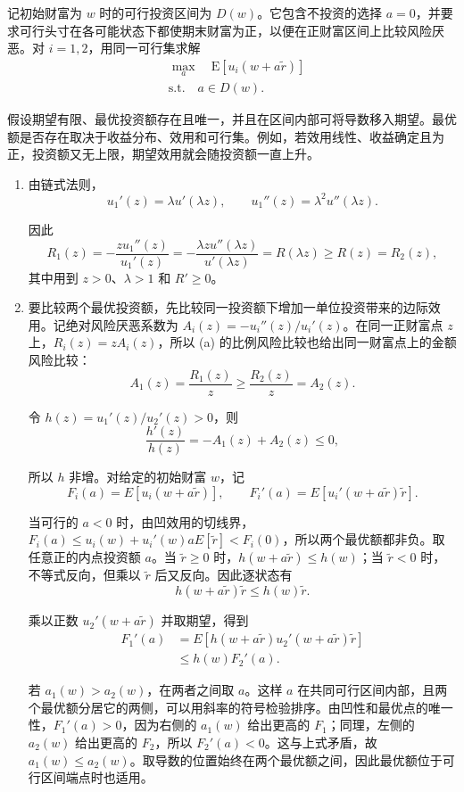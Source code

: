 \begin{solution}[label-content={证明},blank-type=manual,blank-vsep=11\baselineskip]
记初始财富为 $w$ 时的可行投资区间为 $D(w)$。它包含不投资的选择 $a=0$，并要求可行头寸在各可能状态下都使期末财富为正，以便在正财富区间上比较风险厌恶。对 $i=1,2$，用同一可行集求解
\[
 \begin{aligned}
  &\max_a\quad \mathrm E[u_i(w+a\tilde r)]\\
  &\text{s.t.}\quad a\in D(w).
 \end{aligned}
\]

假设期望有限、最优投资额存在且唯一，并且在区间内部可将导数移入期望。最优额是否存在取决于收益分布、效用和可行集。例如，若效用线性、收益确定且为正，投资额又无上限，期望效用就会随投资额一直上升。
\begin{enumerate}[label=(\alph*)]
\item 由链式法则，
\[
 u_1'(z)=\lambda u'(\lambda z),\qquad
 u_1''(z)=\lambda^2u''(\lambda z).
\]

因此
\[
 R_1(z)=-\frac{z u_1''(z)}{u_1'(z)}
 =-\frac{\lambda z u''(\lambda z)}{u'(\lambda z)}
 =R(\lambda z)\ge R(z)=R_2(z),
\]
其中用到 $z>0$、$\lambda>1$ 和 $R'\ge0$。

\item 要比较两个最优投资额，先比较同一投资额下增加一单位投资带来的边际效用。记绝对风险厌恶系数为 $A_i(z)=-u_i''(z)/u_i'(z)$。在同一正财富点 $z$ 上，$R_i(z)=zA_i(z)$，所以 (a) 的比例风险比较也给出同一财富点上的金额风险比较：
\[
 A_1(z)=\frac{R_1(z)}{z}\ge\frac{R_2(z)}{z}=A_2(z).
\]

令 $h(z)=u_1'(z)/u_2'(z)>0$，则
\[
 \frac{h'(z)}{h(z)}=-A_1(z)+A_2(z)\le0,
\]

所以 $h$ 非增。对给定的初始财富 $w$，记
\[
 F_i(a)=E[u_i(w+a\tilde r)],\qquad
 F_i'(a)=E[u_i'(w+a\tilde r)\tilde r].
\]

当可行的 $a<0$ 时，由凹效用的切线界，$F_i(a)\le u_i(w)+u_i'(w)aE[\tilde r]<F_i(0)$，所以两个最优额都非负。取任意正的内点投资额 $a$。当 $\tilde r\ge0$ 时，$h(w+a\tilde r)\le h(w)$；当 $\tilde r<0$ 时，不等式反向，但乘以 $\tilde r$ 后又反向。因此逐状态有
\[
 h(w+a\tilde r)\tilde r\le h(w)\tilde r.
\]

乘以正数 $u_2'(w+a\tilde r)$ 并取期望，得到
\[
 \begin{aligned}
 F_1'(a)
 &=E[h(w+a\tilde r)u_2'(w+a\tilde r)\tilde r]\\
 &\le h(w)F_2'(a).
 \end{aligned}
\]

若 $a_1(w)>a_2(w)$，在两者之间取 $a$。这样 $a$ 在共同可行区间内部，且两个最优额分居它的两侧，可以用斜率的符号检验排序。由凹性和最优点的唯一性，$F_1'(a)>0$，因为右侧的 $a_1(w)$ 给出更高的 $F_1$；同理，左侧的 $a_2(w)$ 给出更高的 $F_2$，所以 $F_2'(a)<0$。这与上式矛盾，故 $a_1(w)\le a_2(w)$。取导数的位置始终在两个最优额之间，因此最优额位于可行区间端点时也适用。


\end{enumerate}
\end{solution}
